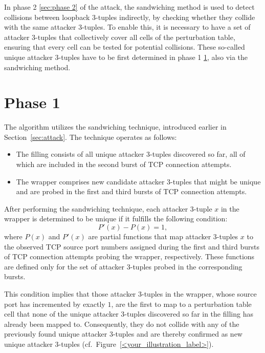 \documentclass{report}
\begin{document}
In phase 2 \ref{sec:phase 2} of the attack, the sandwiching method is used to detect collisions between loopback 3-tuples indirectly, by checking whether they collide with the same attacker 3-tuples. To enable this, it is necessary to have a set of attacker 3-tuples that collectively cover all cells of the perturbation table, ensuring that every cell can be tested for potential collisions. These so-called \alert{unique attacker 3-tuples} have to be first determined in phase 1 \ref{sec:phase 1}, also via the sandwiching method.

\section{Phase 1}
\label{sec:phase 1}

The algorithm utilizes the \alert{sandwiching technique}, introduced earlier in Section~\ref{sec:attack}. The technique operates as follows:

\begin{itemize}
    \item The \alert{filling} consists of all \alert{unique attacker 3-tuples} discovered so far, all of which are included in the second burst of TCP connection attempts.
    \item The \alert{wrapper} comprises new candidate attacker 3-tuples that might be unique and are probed in the first and third bursts of TCP connection attempts.
\end{itemize}

After performing the sandwiching technique, each attacker 3-tuple \( x \) in the wrapper is determined to be \alert{unique} if it fulfills the following \alert{condition}:
\begin{equation}
    P'(x) - P(x) = 1,
\end{equation}
where \(P(x)\) and \(P'(x)\) are partial functions that map \alert{attacker 3-tuples \( x \) to} the observed \alert{TCP source port} numbers assigned during the first and third bursts of TCP connection attempts probing the wrapper, respectively. These functions are defined only for the set of attacker 3-tuples probed in the corresponding bursts.

This \alert{condition implies} that those attacker 3-tuples in the wrapper, whose source port has incremented by exactly $1$, are the first to map to a perturbation table cell that none of the \alert{unique attacker 3-tuples} discovered so far in the filling has already been mapped to. Consequently, they do not collide with any of the previously found \alert{unique attacker 3-tuples} and are thereby confirmed as new \alert{unique attacker 3-tuples} (cf.\ Figure~\ref{<your_illustration_label>}).
\end{document}
